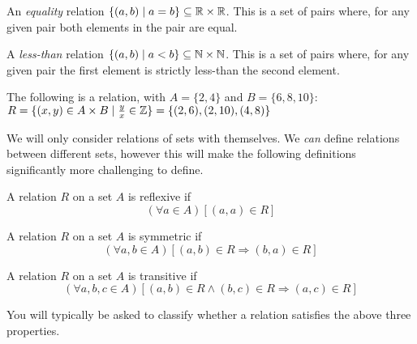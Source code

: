 \documentclass[main.tex]{subfiles}
\begin{document}
\begin{example}
	An \textit{equality} relation \(\{(a,b) \mid a = b\} \subseteq \mathbb{R} \times \mathbb{R}\). This is a set of pairs where, for any given pair both elements in the pair are equal.
\end{example}

\begin{example}
	A \textit{less-than} relation \(\{(a,b) \mid a < b\} \subseteq \mathbb{N} \times \mathbb{N}\). This is a set of pairs where, for any given pair the first element is strictly less-than the second element.
\end{example}

\begin{example}
	The following is a relation, with \(A = \{2,4\}\) and \(B = \{6,8,10\}\): \(R = \{(x,y) \in A \times B \mid \frac{y}{x} \in \mathbb{Z}\} = \{(2,6), (2,10), (4,8)\}\)
\end{example}

\begin{rem}
	We will only consider relations of sets with themselves. We \textit{can} define relations between different sets, however this will make the following definitions significantly more challenging to define.
\end{rem}

\begin{defn}
	A relation \(R\) on a set \(A\) is reflexive if \[(\forall a \in A)[(a,a) \in R]\]
\end{defn}

\begin{defn}
	A relation \(R\) on a set \(A\) is symmetric if \[(\forall a,b \in A)[(a,b) \in R \Rightarrow (b,a) \in R]\]
\end{defn}

\begin{defn}
	A relation \(R\) on a set \(A\) is transitive if \[(\forall a,b,c \in A)[(a,b) \in R \land (b,c) \in R \Rightarrow (a,c) \in R]\]
\end{defn}

You will typically be asked to classify whether a relation satisfies the above three properties.
\end{document}
